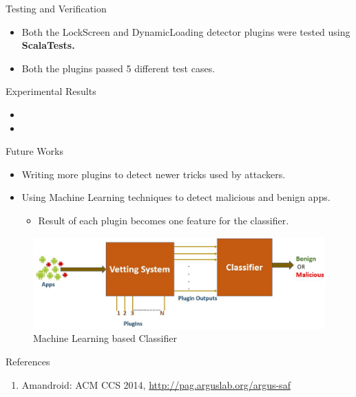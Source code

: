 \documentclass[final,hyperref={pdfpagelabels=false}]{beamer}
\begin{document}
\begin{frame}[t]
\begin{columns}[t]
\begin{column}{.465\textwidth}
\begin{block}{Testing and Verification}
\begin{itemize}
\item Both the LockScreen and DynamicLoading detector plugins were tested using \textbf {ScalaTests.} 
\item Both the plugins passed 5 different test cases. 
\end{itemize}
\end{block}

\begin{block}{Experimental Results}
\begin{itemize}
\item 
\item 
\end{itemize}
\end{block}

\begin{block}{Future Works}

\begin{itemize}
\item Writing more plugins to detect newer tricks used by attackers. 
\item Using Machine Learning techniques to detect malicious and benign apps.  
\begin{itemize}
\item Result of each plugin becomes one feature for the classifier. 
\end{itemize}
\end{itemize}
\begin{figure}
\includegraphics[width=0.8\linewidth]{futureWorks.JPG}
\caption{Machine Learning based Classifier}
\end{figure}


\end{block}


\begin{block}{References}
\begin{enumerate}
\item Amandroid: ACM CCS 2014, \href{http://pag.arguslab.org/argus-saf}{http://pag.arguslab.org/argus-saf} 
\end{enumerate}


\end{block}
\end{column}
\end{columns}
\end{frame}
\end{document}
